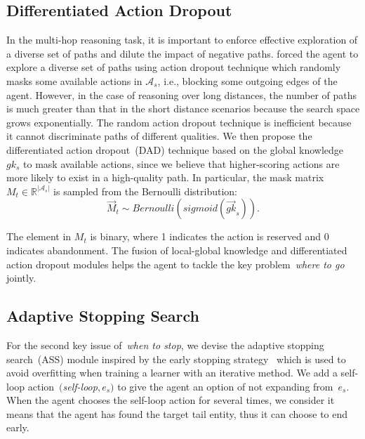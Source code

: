 \subsection{Differentiated Action Dropout}
\label{sec:actiondropout}
In the multi-hop reasoning task, it is important to enforce effective exploration of a diverse set of paths and dilute the impact of negative paths.
\cite{LinEMNLP2018} forced the agent to explore a diverse set of paths using action dropout technique which randomly masks some available actions in $\mathcal{A}_{s}$, i.e., blocking some outgoing edges of the agent. 
However, in the case of reasoning over long distances, the number of paths is much greater than that in the short distance scenarios because the search space grows exponentially.
The random action dropout technique is inefficient because it cannot discriminate paths of different qualities.
We then propose the differentiated action dropout~(DAD) technique based on the global knowledge~$gk_{s}$ to mask available actions, 
since we believe that higher-scoring actions are more likely to exist in a high-quality path.
In particular,
the mask matrix~$M_t \in \mathbb{R}^{\left | \mathcal{A}_{s} \right |}$ is sampled from the Bernoulli distribution:
\begin{equation}
        \vec{M}_t \sim  Bernoulli(sigmoid(\vec{gk}_{s})).
\label{eq:dropout}
\end{equation}

The element in $M_t$ is binary, where 1 indicates the action is reserved and 0 indicates abandonment.
The fusion of local-global knowledge and differentiated action dropout modules helps the agent to tackle the key problem~\textit{where to go} jointly.

\subsection{Adaptive Stopping Search}
\label{sec:earlystopping}
For the second key issue of~\textit{when to stop}, 
we devise the adaptive stopping search~(ASS) module inspired by the early stopping strategy~\cite{Prechelt97earlystopping} which is used to avoid overfitting when training a learner with an iterative method.
We add a self-loop action~$($\textit{self-loop}$,e_{s})$ to give the agent an option of not expanding from~$e_{s}$.
When the agent chooses the self-loop action for several times, we consider it means that the agent has found the target tail entity, thus it can choose to end early.


